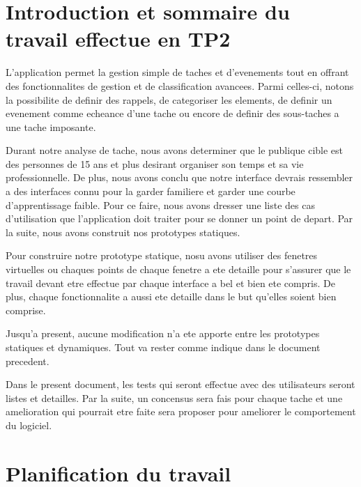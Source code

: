 \documentclass[letterpaper, oneside, 12pt, these, creativecommons]{thETS}
\begin{document}


\tableofcontents
\listoftables
\listoffigures

\chapter{Introduction et sommaire du travail effectue en TP2}

L'application permet la gestion simple de taches et d'evenements tout en offrant des fonctionnalites de gestion et de classification avancees. Parmi celles-ci, notons la possibilite de definir des rappels, de categoriser les elements, de definir un evenement comme echeance d'une tache ou encore de definir des sous-taches a une tache imposante.

Durant notre analyse de tache, nous avons determiner que le publique cible est des personnes de 15 ans et plus desirant organiser son temps et sa vie professionnelle. De plus, nous avons conclu que notre interface devrais ressembler a des interfaces connu pour la garder familiere et garder une courbe d'apprentissage faible. Pour ce faire, nous avons dresser une liste des cas d'utilisation que l'application doit traiter pour se donner un point de depart. Par la suite, nous avons construit nos prototypes statiques.

Pour construire notre prototype statique, nosu avons utiliser des fenetres virtuelles ou chaques points de chaque fenetre a ete detaille pour s'assurer que le travail devant etre effectue par chaque interface a bel et bien ete compris. De plus, chaque fonctionnalite a aussi ete detaille dans le but qu'elles soient bien comprise.

Jusqu'a present, aucune modification n'a ete apporte entre les prototypes statiques et dynamiques. Tout va rester comme indique dans le document precedent.

Dans le present document, les tests qui seront effectue avec des utilisateurs seront listes et detailles. Par la suite, un concensus sera fais pour chaque tache et une amelioration qui pourrait etre faite sera proposer pour ameliorer le comportement du logiciel.

\chapter{Planification du travail}
\end{document}
